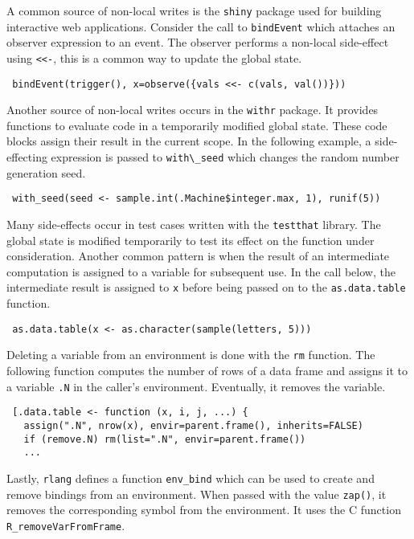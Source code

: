 \documentclass[review,creen,acmsmall]{acmart}
\newcommand{\code}[1]{\lstinline |#1|\xspace}
\renewcommand{\c}[1]{\lstinline |#1|\xspace}
\begin{document}
A common source of non-local writes is the \c{shiny} package used for building
interactive web applications. Consider the call to \code{bindEvent} which
attaches an observer expression to an event. The observer performs a non-local
side-effect using \code{<<-}, this is a common way to update the global state.
%
\begin{lstlisting}
 bindEvent(trigger(), x=observe({vals <<- c(vals, val())}))
\end{lstlisting}
%
\noindent
Another source of non-local writes occurs in the \code{withr} package. It
provides functions to evaluate code in a temporarily modified global state. These
code blocks assign their result in the current scope. In the following example, a
side-effecting expression is passed to \code{with\_seed} which changes the
random number generation seed.
%
\begin{lstlisting}
 with_seed(seed <- sample.int(.Machine$integer.max, 1), runif(5))
\end{lstlisting}
%
\noindent
Many side-effects occur in test cases written with the \code{testthat} library.
The global state is modified temporarily to test its effect on the function
under consideration.
%
Another common pattern is when the result of an intermediate computation is
assigned to a variable for subsequent use. In the call below, the intermediate
result is assigned to \code{x} before being passed on to the
\code{as.data.table} function.
%
\begin{lstlisting}
 as.data.table(x <- as.character(sample(letters, 5)))
\end{lstlisting}
%
\noindent
Deleting a variable from an environment is done with the \code{rm} function.
The following function computes the number of rows of a data frame and assigns
it to a variable \code{.N} in the caller's environment. Eventually, it removes the
variable.
%
\begin{lstlisting}
 [.data.table <- function (x, i, j, ...) {
   assign(".N", nrow(x), envir=parent.frame(), inherits=FALSE)
   if (remove.N) rm(list=".N", envir=parent.frame())
   ...
\end{lstlisting}
\noindent
Lastly, \code{rlang} defines a function \code{env_bind} which can be used to
create and remove bindings from an environment. When passed with the value
\code{zap()}, it removes the corresponding symbol from the environment. It uses
the C function \code{R_removeVarFromFrame}.
\end{document}

